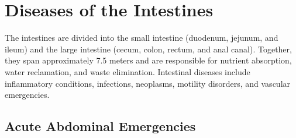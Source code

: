 \chapter{Diseases of the Intestines}
\label{ch:intestines}
The intestines are divided into the small intestine (duodenum, jejunum, and ileum) and the large intestine (cecum, colon, rectum, and anal canal). Together, they span approximately 7.5 meters and are responsible for nutrient absorption, water reclamation, and waste elimination. Intestinal diseases include inflammatory conditions, infections, neoplasms, motility disorders, and vascular emergencies.

\section{Acute Abdominal Emergencies}








\label{sec:Acute Abdominal Emergencies}

